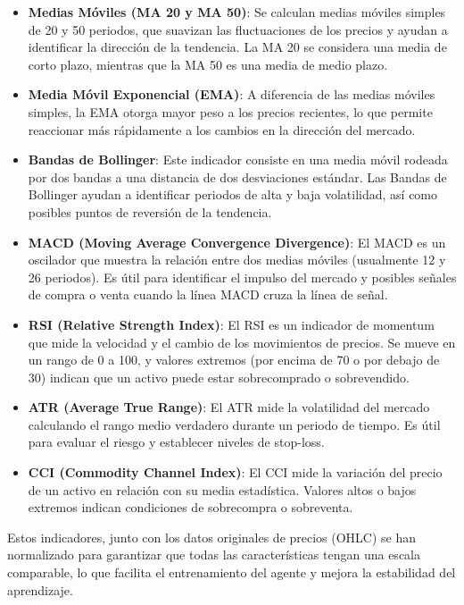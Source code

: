 \documentclass[a4paper,12pt, twoside]{report}
\begin{document}
\begin{itemize}
    \item \textbf{Medias Móviles (MA 20 y MA 50)}: Se calculan medias móviles simples de 20 y 50 periodos, que suavizan las fluctuaciones de los precios y ayudan a identificar la dirección de la tendencia. La MA 20 se considera una media de corto plazo, mientras que la MA 50 es una media de medio plazo.
    
    \item \textbf{Media Móvil Exponencial (EMA)}: A diferencia de las medias móviles simples, la EMA otorga mayor peso a los precios recientes, lo que permite reaccionar más rápidamente a los cambios en la dirección del mercado.

    \item \textbf{Bandas de Bollinger}: Este indicador consiste en una media móvil rodeada por dos bandas a una distancia de dos desviaciones estándar. Las Bandas de Bollinger ayudan a identificar periodos de alta y baja volatilidad, así como posibles puntos de reversión de la tendencia.

    \item \textbf{MACD (Moving Average Convergence Divergence)}: El MACD es un oscilador que muestra la relación entre dos medias móviles (usualmente 12 y 26 periodos). Es útil para identificar el impulso del mercado y posibles señales de compra o venta cuando la línea MACD cruza la línea de señal.

    \item \textbf{RSI (Relative Strength Index)}: El RSI es un indicador de momentum que mide la velocidad y el cambio de los movimientos de precios. Se mueve en un rango de 0 a 100, y valores extremos (por encima de 70 o por debajo de 30) indican que un activo puede estar sobrecomprado o sobrevendido.

    \item \textbf{ATR (Average True Range)}: El ATR mide la volatilidad del mercado calculando el rango medio verdadero durante un periodo de tiempo. Es útil para evaluar el riesgo y establecer niveles de stop-loss.

    \item \textbf{CCI (Commodity Channel Index)}: El CCI mide la variación del precio de un activo en relación con su media estadística. Valores altos o bajos extremos indican condiciones de sobrecompra o sobreventa.
\end{itemize}

Estos indicadores, junto con los datos originales de precios (OHLC) se han normalizado para 
garantizar que todas las características tengan una escala comparable, lo que facilita el 
entrenamiento del agente y mejora la estabilidad del aprendizaje.
\end{document}

